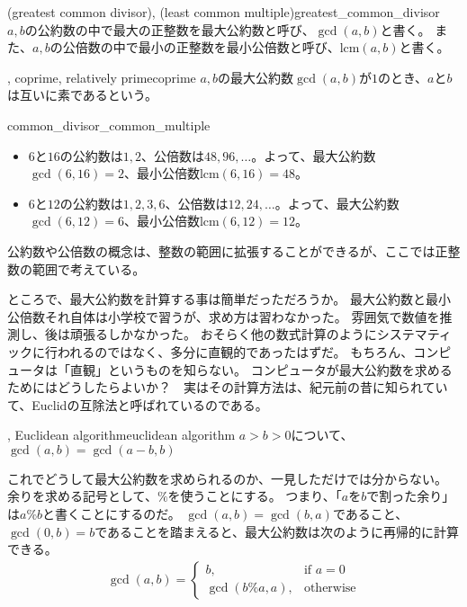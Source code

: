 \begin{Defi}{(greatest common divisor), (least common multiple)}{greatest_common_divisor}
$a,b$の公約数の中で最大の正整数を最大公約数と呼び、$\gcd(a,b)$と書く。
また、$a,b$の公倍数の中で最小の正整数を最小公倍数と呼び、$\mbox{lcm}(a,b)$と書く。
\end{Defi}

\begin{Defi}{, coprime, relatively prime}{coprime}
$a,b$の最大公約数$\gcd(a,b)$が$1$のとき、$a$と$b$は互いに素であるという。
\end{Defi}

\begin{Exam}{}{common_divisor_common_multiple}\;
\begin{itemize}
\item $6$と$16$の公約数は$1,2$、公倍数は$48, 96, \ldots$。よって、最大公約数$\gcd(6,16)=2$、最小公倍数$\mbox{lcm}(6,16)=48$。
\item $6$と$12$の公約数は$1,2,3,6$、公倍数は$12, 24, \ldots$。よって、最大公約数$\gcd(6,12)=6$、最小公倍数$\mbox{lcm}(6,12)=12$。
\end{itemize}
\end{Exam}

公約数や公倍数の概念は、整数の範囲に拡張することができるが、ここでは正整数の範囲で考えている。

ところで、最大公約数を計算する事は簡単だっただろうか。
最大公約数と最小公倍数それ自体は小学校で習うが、求め方は習わなかった。
雰囲気で数値を推測し、後は頑張るしかなかった。
おそらく他の数式計算のようにシステマティックに行われるのではなく、多分に直観的であったはずだ。
もちろん、コンピュータは「直観」というものを知らない。
コンピュータが最大公約数を求めるためにはどうしたらよいか？　実はその計算方法は、紀元前の昔に知られていて、Euclidの互除法と呼ばれているのである。

\begin{Theo}{, Euclidean algorithm}{euclidean algorithm}
$a>b>0$について、$\gcd(a,b) = \gcd(a - b, b)$
\end{Theo}

これでどうして最大公約数を求められるのか、一見しただけでは分からない。
余りを求める記号として、$\%$を使うことにする。
つまり、「$a$を$b$で割った余り」は$a \% b$と書くことにするのだ。
$\gcd(a,b)=\gcd(b,a)$であること、$\gcd(0,b)=b$であることを踏まえると、最大公約数は次のように再帰的に計算できる。
\begin{align*}
\gcd(a,b) =
\begin{cases}
b, &\mbox{if } a = 0\\
\gcd(b \% a, a), &\mbox{otherwise}
\end{cases}
\end{align*}

